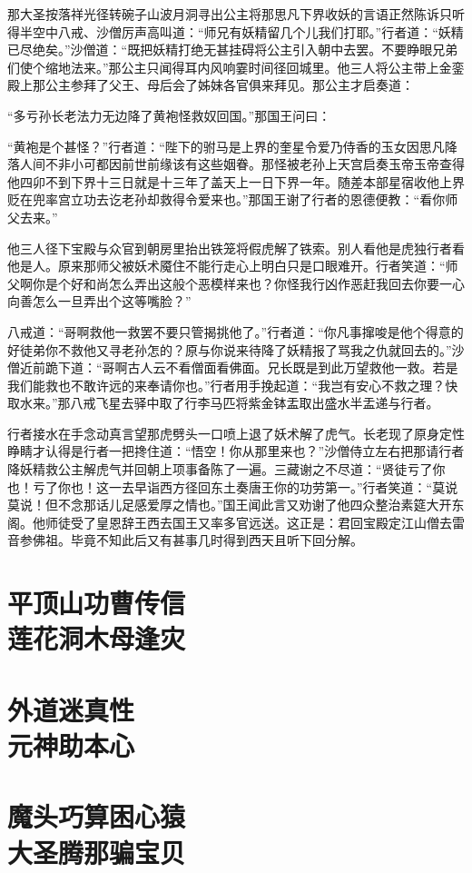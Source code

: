 \documentclass[12pt,UTF8]{ctexbook}
\begin{document}
{那大圣按落祥光径转碗子山波月洞寻出公主将那思凡下界收妖的言语正然陈诉只听得半空中八戒、沙僧厉声高叫道：“师兄有妖精留几个儿我们打耶。”行者道：“妖精已尽绝矣。”沙僧道：“既把妖精打绝无甚挂碍将公主引入朝中去罢。不要睁眼兄弟们使个缩地法来。”那公主只闻得耳内风响霎时间径回城里。他三人将公主带上金銮殿上那公主参拜了父王、母后会了姊妹各官俱来拜见。那公主才启奏道：

“多亏孙长老法力无边降了黄袍怪救奴回国。”那国王问曰：

“黄袍是个甚怪？”行者道：“陛下的驸马是上界的奎星令爱乃侍香的玉女因思凡降落人间不非小可都因前世前缘该有这些姻眷。那怪被老孙上天宫启奏玉帝玉帝查得他四卯不到下界十三日就是十三年了盖天上一日下界一年。随差本部星宿收他上界贬在兜率宫立功去讫老孙却救得令爱来也。”那国王谢了行者的恩德便教：“看你师父去来。”

他三人径下宝殿与众官到朝房里抬出铁笼将假虎解了铁索。别人看他是虎独行者看他是人。原来那师父被妖术魇住不能行走心上明白只是口眼难开。行者笑道：“师父啊你是个好和尚怎么弄出这般个恶模样来也？你怪我行凶作恶赶我回去你要一心向善怎么一旦弄出个这等嘴脸？”

八戒道：“哥啊救他一救罢不要只管揭挑他了。”行者道：“你凡事撺唆是他个得意的好徒弟你不救他又寻老孙怎的？原与你说来待降了妖精报了骂我之仇就回去的。”沙僧近前跪下道：“哥啊古人云不看僧面看佛面。兄长既是到此万望救他一救。若是我们能救也不敢许远的来奉请你也。”行者用手挽起道：“我岂有安心不救之理？快取水来。”那八戒飞星去驿中取了行李马匹将紫金钵盂取出盛水半盂递与行者。

行者接水在手念动真言望那虎劈头一口喷上退了妖术解了虎气。长老现了原身定性睁睛才认得是行者一把搀住道：“悟空！你从那里来也？”沙僧侍立左右把那请行者降妖精救公主解虎气并回朝上项事备陈了一遍。三藏谢之不尽道：“贤徒亏了你也！亏了你也！这一去早诣西方径回东土奏唐王你的功劳第一。”行者笑道：“莫说莫说！但不念那话儿足感爱厚之情也。”国王闻此言又劝谢了他四众整治素筵大开东阁。他师徒受了皇恩辞王西去国王又率多官远送。这正是：君回宝殿定江山僧去雷音参佛祖。毕竟不知此后又有甚事几时得到西天且听下回分解。

\chapter[平顶山功曹传信\ 莲花洞木母逢灾]{平顶山功曹传信\\莲花洞木母逢灾}
\chapter[外道迷真性\ 元神助本心]{外道迷真性\\元神助本心}
\chapter[魔头巧算困心猿\ 大圣腾那骗宝贝]{魔头巧算困心猿\\大圣腾那骗宝贝}
}
\end{document}
